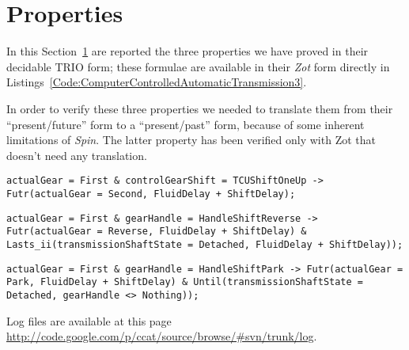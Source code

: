 \section{Properties}
\label{Section:Properties}
In this Section~\ref{Section:Properties} are reported the three properties we have proved in their decidable TRIO form; these formulae are available in their \emph{Zot} form directly in Listings~\ref{Code:ComputerControlledAutomaticTransmission3}. 

In order to verify these three properties we needed to translate them from their ``present/future'' form to a ``present/past'' form, because of some inherent limitations of \emph{Spin}. The latter property has been verified only with Zot that doesn't need any translation.

\begin{lstlisting}[language=TRIO,basicstyle=\small,breaklines,breakatwhitespace,frame=single,caption=Property 1,label=Code:Property1]
actualGear = First & controlGearShift = TCUShiftOneUp -> Futr(actualGear = Second, FluidDelay + ShiftDelay);
\end{lstlisting}

\begin{lstlisting}[language=TRIO,basicstyle=\small,breaklines,breakatwhitespace,frame=single,caption=Property 2,label=Code:Property2]
actualGear = First & gearHandle = HandleShiftReverse -> Futr(actualGear = Reverse, FluidDelay + ShiftDelay) & Lasts_ii(transmissionShaftState = Detached, FluidDelay + ShiftDelay));
\end{lstlisting}

\begin{lstlisting}[language=TRIO,basicstyle=\small,breaklines,breakatwhitespace,frame=single,caption=Property 3,label=Code:Property3]
actualGear = First & gearHandle = HandleShiftPark -> Futr(actualGear = Park, FluidDelay + ShiftDelay) & Until(transmissionShaftState = Detached, gearHandle <> Nothing));
\end{lstlisting}

Log files are available at this page \url{http://code.google.com/p/ccat/source/browse/#svn/trunk/log}.

